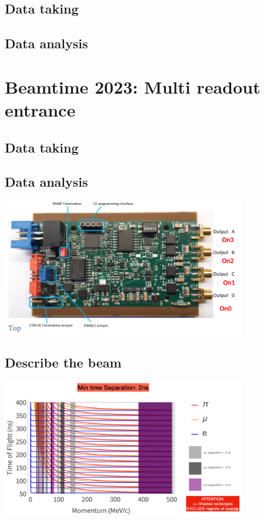 \begin{refsection}
    \subsection{Data taking}
    \subsection{Data analysis}
\section{Beamtime 2023: Multi readout entrance}
    \subsection{Data taking}
    \subsection{Data analysis}

\includegraphics[width=0.8\textwidth]{Figures/muEDM_Dec2021/HV.png}\\
\subsection{Describe the beam}
\includegraphics[width=0.8\textwidth]{Figures/muEDM_Dec2021/ToFPlots-0.png}\\


\end{refsection}
